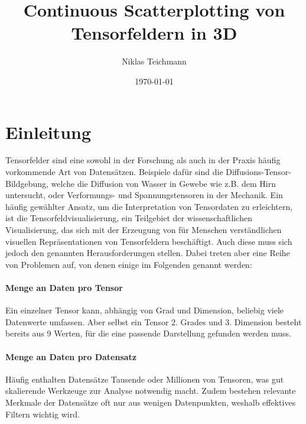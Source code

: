 \documentclass[a4paper,fontsize=12pt,toc=bib,halfparskip]{scrartcl}
\title{Continuous Scatterplotting von Tensorfeldern in 3D\xspace}
\author{Niklas Teichmann}
\date{\today}
\begin{document}
\maketitle\clearpage
\tableofcontents
\thispagestyle{empty}
\clearpage



\section{Einleitung}
Tensorfelder sind eine sowohl in der Forschung als auch in der Praxis h\"aufig vorkommende Art von Datens\"atzen. Beispiele daf\"ur sind die Diffusions-Tensor-Bildgebung\cite{basser1994mr}, welche die Diffusion von Wasser in Gewebe wie z.B. dem Hirn untersucht, oder Verformungs-\cite[S.~122]{FundamentalsofStructuralMechanics} und Spannungstensoren\cite[S.~154]{FundamentalsofStructuralMechanics} in der Mechanik. Ein h\"aufig gew\"ahlter Ansatz, um die Interpretation von Tensordaten zu erleichtern, ist die Tensorfeldvisualisierung, ein Teilgebiet der wissenschaftlichen Visualisierung, das sich mit der Erzeugung von f\"ur Menschen verst\"andlichen visuellen Repr\"asentationen von Tensorfeldern besch\"aftigt. Auch diese muss sich jedoch den genannten Herausforderungen stellen. Dabei treten aber eine Reihe von Problemen auf, von denen einige im Folgenden genannt werden\cite{hlawitschka2014top}\cite{fritzsch2016continuousScatterplot}:

\paragraph{Menge an Daten pro Tensor}
Ein einzelner Tensor kann, abh\"angig von Grad und Dimension, beliebig viele Datenwerte umfassen. Aber selbst ein Tensor 2. Grades und 3. Dimension besteht bereits aus 9 Werten, f\"ur die eine passende Darstellung gefunden werden muss.

\paragraph{Menge an Daten pro Datensatz}
H\"aufig enthalten Datens\"atze Tausende oder Millionen von Tensoren, was gut skalierende Werkzeuge zur Analyse notwendig macht. Zudem bestehen relevante Merkmale der Datens\"atze oft nur aus wenigen Datenpunkten, weshalb effektives Filtern wichtig wird.
\end{document}

